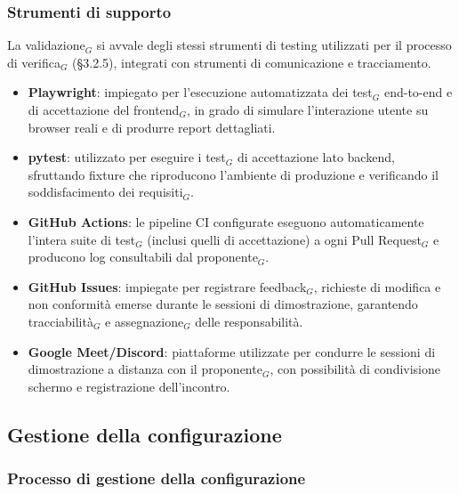 \documentclass[a4paper, 10pt]{article}
\begin{document}
\subsubsection{Strumenti di supporto}
\label{subsec:strumenti_validazione}

La validazione$_G$ si avvale degli stessi strumenti di testing utilizzati per il processo di verifica$_G$ (§3.2.5), integrati con strumenti di comunicazione e tracciamento.

\begin{itemize}
    \item \textbf{Playwright}: impiegato per l'esecuzione automatizzata dei test$_G$ end-to-end e di accettazione del frontend$_G$, in grado di simulare l'interazione utente su browser reali e di produrre report dettagliati.
    \item \textbf{pytest}: utilizzato per eseguire i test$_G$ di accettazione lato backend, sfruttando fixture che riproducono l'ambiente di produzione e verificando il soddisfacimento dei requisiti$_G$.
    \item \textbf{GitHub Actions}: le pipeline CI configurate eseguono automaticamente l'intera suite di test$_G$ (inclusi quelli di accettazione) a ogni Pull Request$_G$ e producono log consultabili dal proponente$_G$.
    \item \textbf{GitHub Issues}: impiegate per registrare feedback$_G$, richieste di modifica e non conformità emerse durante le sessioni di dimostrazione, garantendo tracciabilità$_G$ e assegnazione$_G$ delle responsabilità.
    \item \textbf{Google Meet/Discord}: piattaforme utilizzate per condurre le sessioni di dimostrazione a distanza con il proponente$_G$, con possibilità di condivisione schermo e registrazione dell'incontro.
\end{itemize}

\subsection{Gestione della configurazione}
\label{subsec:gestione_configurazione}

\subsubsection{Processo di gestione della configurazione}
\label{subsubsec:processo_configurazione}
\end{document}
